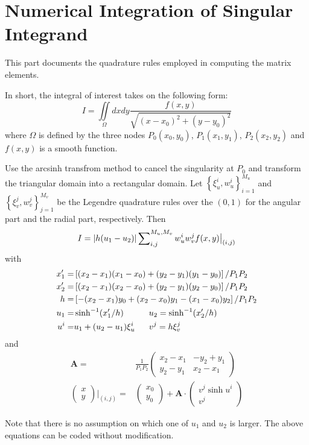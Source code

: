 \documentclass[main]{subfiles}
\begin{document}
\section{Numerical Integration of Singular Integrand}
\label{sec:numerical integration of singular integrand}
This part documents the quadrature rules employed in computing the matrix
elements. 

In short, the integral of interest takes on the following form:
\begin{equation*}
	I=\iint\limits_\Omega dx dy\frac{f(x,y)}{\sqrt{(x-x_0)^2+(y-y_0)^2}}
\end{equation*}
where $\Omega$ is defined by the three nodes
$P_0(x_0,y_0)$, $P_1(x_1,y_1)$, $P_2(x_2,y_2)$ and $f(x,y)$ is a smooth function.

Use the arcsinh transfrom method to cancel the singularity at $P_0$ and
transform the triangular domain into a rectangular domain. Let 
$\left\{\xi_u^i,w_u^i\right\}_{i=1}^{M_u}$ and 
$\left\{\xi_v^j,w_v^j\right\}_{j=1}^{M_v}$ be the Legendre quadrature rules over
the $(0,1)$ for the angular part and the radial part, respectively. Then
\begin{equation*}
	I=\left| h(u_1-u_2) \right|\sum\nolimits_{i,j}^{M_u,M_v}w_u^i w_v^j
	f(x,y)\big\vert_{(i,j)}
\end{equation*}
with
\begin{align*}
x_1^{\prime}=&\left[(x_2-x_1)(x_1-x_0)+(y_2-y_1)(y_1-y_0)\right]/P_1 P_2 \\
x_2^{\prime}=&\left[(x_2-x_1)(x_2-x_0)+(y_2-y_1)(y_2-y_0)\right]/P_1 P_2 \\
h=& \left[-(x_2-x_1)y_0+(x_2-x_0)y_1-(x_1-x_0)y_2\right]/P_1 P_2 \\
u_1=& \sinh^{-1}(x_1^{\prime}/h) \ \ \ \ \ \ \ \ \ u_2= \sinh^{-1}(x_2^{\prime}/h) \\
u^i=& u_1+(u_2-u_1)\xi_u^i \ \ \ \ \ v^j=h\xi_v^j
\end{align*}
and
\begin{align*}
	\mathbf{A} =& \frac{1}{P_1 P_2} \begin{pmatrix}
		x_2-x_1 & -y_2+y_1 \\
		y_2-y_1 & x_2-x_1
	\end{pmatrix}	\\
	\begin{pmatrix} x \\ y \end{pmatrix} \bigg\vert_{(i,j)} =&
	\begin{pmatrix} x_0 \\ y_0 \end{pmatrix} + \mathbf{A}\cdot
	\begin{pmatrix} v^j\sinh{u^i} \\ v^j \end{pmatrix}
\end{align*}

Note that there is no assumption on which one of $u_1$ and $u_2$ is larger. The
above equations can be coded without modification.
\end{document}

